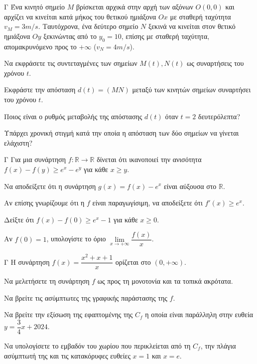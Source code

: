 \begin{thema}{Γ}
Ένα κινητό σημείο $M$ βρίσκεται αρχικά στην αρχή των αξόνων $O(0,0)$ και αρχίζει να κινείται κατά μήκος του θετικού ημιάξονα $Ox$ με σταθερή ταχύτητα $v_M = 3\si{m/s}$. Ταυτόχρονα, ένα δεύτερο σημείο $N$ ξεκινά να κινείται στον θετικό ημιάξονα $Oy$ ξεκινώντας από το $y_0 = 10$, επίσης με σταθερή ταχύτητα, απομακρυνόμενο προς το $+\infty$ ($v_N = 4\si{m/s}$). 
\begin{erwthma}
  \item Να εκφράσετε τις συντεταγμένες των σημείων $M(t), N(t)$ ως συναρτήσεις του χρόνου $t$.
  \item Εκφράστε την απόσταση $d(t) = (MN)$ μεταξύ των κινητών σημείων συναρτήσει του χρόνου $t$.
  \item Ποιος είναι ο ρυθμός μεταβολής της απόστασης $d(t)$ όταν $t = 2$ δευτερόλεπτα?
  \item Υπάρχει χρονική στιγμή κατά την οποία η απόσταση των δύο σημείων να γίνεται ελάχιστη?
\end{erwthma}
\end{thema}

\begin{thema}{Γ}
Για μια συνάρτηση $f: \mathbb{R} \to \mathbb{R}$ δίνεται ότι ικανοποιεί την ανισότητα $f(x) - f(y) \ge e^x - e^y$ για κάθε $x \ge y$. 
\begin{erwthma}
  \item Να αποδείξετε ότι η συνάρτηση $g(x) = f(x) - e^x$ είναι αύξουσα στο $\mathbb{R}$.
  \item Αν επίσης γνωρίζουμε ότι η $f$ είναι παραγωγίσιμη, να αποδείξετε ότι $f'(x) \ge e^x$.
  \item Δείξτε ότι $f(x) - f(0) \ge e^x - 1$ για κάθε $x\geq 0$.
  \item Αν $f(0) = 1$, υπολογίστε το όριο $\lim\limits_{x \to +\infty} \dfrac{f(x)}{x}$.
\end{erwthma}
\end{thema}

\begin{thema}{Γ}
Η συνάρτηση $f(x) = \dfrac{x^2+x+1}{x}$ ορίζεται στο $(0, +\infty)$.
\begin{erwthma}
  \item Να μελετήσετε τη συνάρτηση $f$ ως προς τη μονοτονία και τα τοπικά ακρότατα.
  \item Να βρείτε τις ασύμπτωτες της γραφικής παράστασης της $f$.
  \item Να βρείτε την εξίσωση της εφαπτομένης της $C_f$ η οποία είναι παράλληλη στην ευθεία $y = \dfrac{3}{4}x + 2024$.
  \item Να υπολογίσετε το εμβαδόν του χωρίου που περικλείεται από τη $C_f$, την πλάγια ασύμπτωτή της και τις κατακόρυφες ευθείες $x=1$ και $x=e$.
\end{erwthma}
\end{thema}

